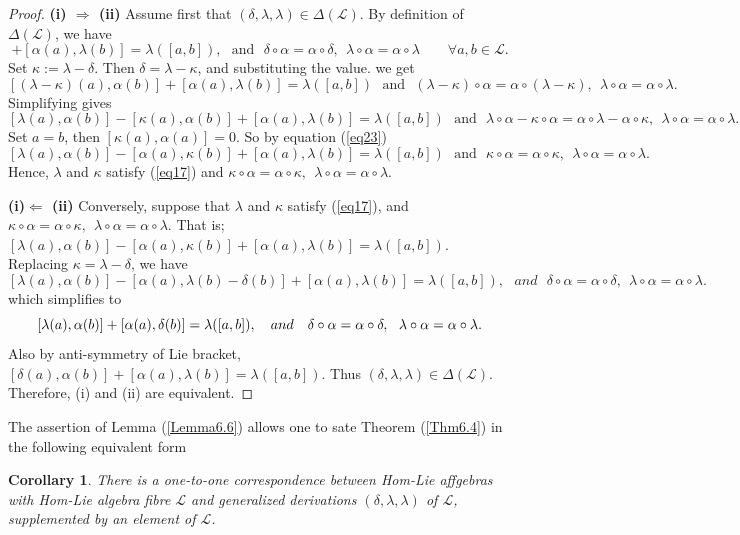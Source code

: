 \documentclass[14pt]{article}
\theoremstyle{Definition}
\newtheorem{Coro}[thm]{Corollary}
\theoremstyle{remark}
\begin{document}
\begin{proof}
\textbf{(i) $\Rightarrow$ (ii)}
Assume first that $(\delta, \lambda, \lambda) \in \Delta(\mathcal{L})$.  
By definition of $\Delta(\mathcal{L})$, we have
\begin{equation*}
[\delta(a),\alpha(b)] + [\alpha(a), \lambda(b)] = \lambda([a,b]),~~~\text{and}~~~\delta\circ\alpha=\alpha\circ\delta,~~\lambda\circ\alpha=\alpha\circ\lambda \qquad \forall a,b \in \mathcal{L}.
\end{equation*}
Set $\kappa := \lambda - \delta$.  Then $\delta = \lambda - \kappa$, and substituting the value. we get
\[
[(\lambda - \kappa)(a),\alpha(b)] + [\alpha(a), \lambda(b)] = \lambda([a,b])~~~\text{and}~~~(\lambda-\kappa)\circ\alpha=\alpha\circ(\lambda-\kappa),~~\lambda\circ\alpha=\alpha\circ\lambda.
\]
Simplifying gives
\[
[\lambda(a),\alpha(b)] - [\kappa(a),\alpha(b)] + [\alpha(a), \lambda(b)] = \lambda([a,b])~~~\text{and}~~~\lambda\circ\alpha-\kappa\circ\alpha=\alpha\circ\lambda-\alpha\circ\kappa,~~\lambda\circ\alpha=\alpha\circ\lambda.
\]
Set $a=b$, then $[\kappa(a),\alpha(a)]=0$. So by equation (\ref{eq23})
\[
[\lambda(a),\alpha(b)] - [\alpha(a),\kappa(b)] + [\alpha(a), \lambda(b)] = \lambda([a,b])~~~\text{and}~~~\kappa\circ\alpha=\alpha\circ\kappa,~~\lambda\circ\alpha=\alpha\circ\lambda.
\]
Hence, $\lambda$ and $\kappa$ satisfy (\ref{eq17}) and $\kappa\circ\alpha=\alpha\circ\kappa,~~\lambda\circ\alpha=\alpha\circ\lambda$.

\textbf{(i)$\Leftarrow$ (ii)} Conversely, suppose that $\lambda$ and $\kappa$ satisfy (\ref{eq17}), and $\kappa\circ\alpha=\alpha\circ\kappa,~~\lambda\circ\alpha=\alpha\circ\lambda$. That is; $[\lambda(a),\alpha(b)] - [\alpha(a),\kappa(b)] + [\alpha(a), \lambda(b)] = \lambda([a,b])$.
Replacing $\kappa = \lambda - \delta$, we have
\[
[\lambda(a),\alpha(b)] - [\alpha(a),\lambda(b)-\delta(b)] + [\alpha(a), \lambda(b)] = \lambda([a,b]),~~~and~~~\delta\circ\alpha=\alpha\circ\delta,~~\lambda\circ\alpha
=\alpha\circ\lambda.\]
which simplifies to
\[
[\lambda(a),\alpha(b)]+[\alpha(a),\delta(b)]=
\lambda([a,b]),~~~and~~~\delta\circ\alpha=\alpha\circ\delta,~~\lambda\circ\alpha
=\alpha\circ\lambda.\\
\]
Also by anti-symmetry of Lie bracket, $[\delta(a),\alpha(b)]+[\alpha(a),\lambda(b)]=
\lambda([a,b])$. 
Thus $(\delta, \lambda, \lambda) \in \Delta(\mathcal{L})$.  Therefore, (i) and (ii) are equivalent.
\end{proof}
The assertion of Lemma (\ref{Lemma6.6}) allows one to sate Theorem (\ref{Thm6.4}) in the following equivalent form
\begin{Coro}
There is a one-to-one correspondence between Hom-Lie affgebras with Hom-Lie algebra fibre $\mathcal{L}$ and generalized derivations $(\delta, \lambda, \lambda)$ of $\mathcal{L}$, supplemented by an element of $\mathcal{L}$.
\end{Coro}
\end{document}
